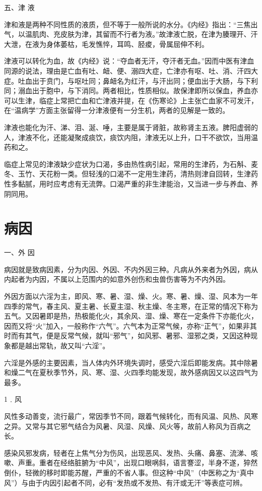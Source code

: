 \documentclass[12pt,UTF8]{ctexbook}
\begin{document}
五、津 液

津和液是两种不同性质的液质，但不等于一般所说的水分。《内经》指出：“三焦出气，以温肌肉、充皮肤为津，其留而不行者为液。”故津液亡脱，在津为腠理开、汗大泄，在液为身体萎枯，毛发憔悴，耳鸣、胫痠，骨属屈伸不利。

津液可以转化为血，故《内经》说：“夺血者无汗，夺汗者无血。”因而中医有津血同源的说法，理由是亡血有吐、衄、便、溺四大症，亡津亦有呕、吐、消、汗四大症。吐血出于贲门，与呕吐同；鼻衄名为红汗，与汗出同；便血出于大肠，与下利同；溺血出于胞中，与下消同。两者相比，性质相似。故保津即所以保血，养血亦可以生津，临症上常把亡血和亡津液并提，在《伤寒论》上主张亡血家不可发汗，在“温病学”方面主张留得一分津液便有一分生机，两者的见解是一致的。

津液也能化为汗、涕、泪、涎、唾，主要是属于肾脏，故称肾主五液。脾阳虚弱的人，津液不化，还能凝聚成痰饮，痰饮内阻，津液无以上升，口干不欲饮，当用温药和之。

临症上常见的津液缺少症状为口渴，多由热性病引起，常用的生津药，为石斛、麦冬、玉竹、天花粉一类。但轻浅的口渴不一定用生津药，清热则津自回转，生津药性多黏腻，用时应考虑有无流弊。口渴严重的非生津能治，又当进一步与养血、养阴同用。

\section{病因}

一、外 因

病因就是致病因素，分为内因、外因、不内外因三种。凡病从外来者为外因，病从内起者为内因，不属以上范围内的如意外创伤和虫兽伤害等为不内外因。

外因方面以六淫为主，即风、寒、暑、湿、燥、火。寒、暑、燥、湿、风本为一年四季的常气，春主风、夏主暑、长夏主湿、秋主燥、冬主寒，在正常的情况下称为五气。又因暑即是热，热极能化火，其余风、湿、燥、寒在一定条件下亦能化火，因而又将“火”加入，一般称作“六气”。六气本为正常气候，亦称“正气”，如果非其时而有其气，便是反常气候，就叫“邪气”，如风邪、暑邪、湿邪之类，又因这种现象都是越出常轨，故又叫“六淫”。

六淫是外感的主要因素，当人体内外环境失调时，感受六淫后即能发病。其中除暑和燥二气在夏秋季节外，风、寒、湿、火四季均能发现，故外感病因又以这四气为最多。

1﹒风

风性多动善变，流行最广，常因季节不同，跟着气候转化，而有风温、风热、风寒之异。又常与其它邪气结合为风暑、风湿、风燥、风火等，故前人称风为百病之长。

感染风邪发病，轻者在上焦气分为伤风，出现恶风、发热、头痛、鼻塞、流涕、咳嗽、声重。重者在经络脏腑为“中风”，出现口眼㖞斜，语言謇涩，半身不遂，猝然倒仆，轻微的移时即能苏醒，严重的不省人事。但这种“中风”（中医称之为“真中风”）与由于内因引起者不同，必有“发热或不发热、有汗或无汗”等表症可辨。
\end{document}
